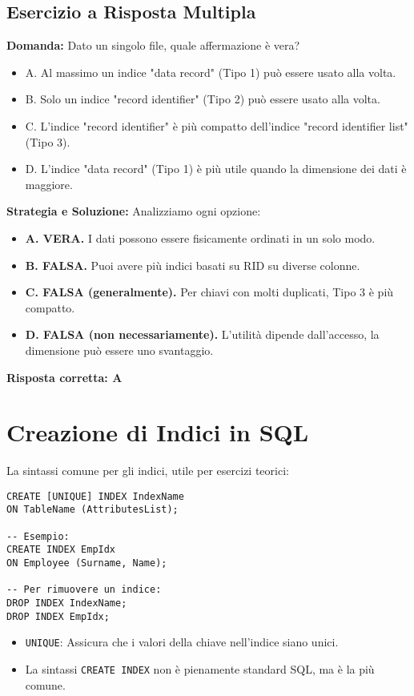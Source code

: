 \subsection{Esercizio a Risposta Multipla}
\textbf{Domanda:} Dato un singolo file, quale affermazione è vera?
\begin{itemize}
    \item A. Al massimo un indice "data record" (Tipo 1) può essere usato alla volta.
    \item B. Solo un indice "record identifier" (Tipo 2) può essere usato alla volta.
    \item C. L'indice "record identifier" è più compatto dell'indice "record identifier list" (Tipo 3).
    \item D. L'indice "data record" (Tipo 1) è più utile quando la dimensione dei dati è maggiore.
\end{itemize}

\textbf{Strategia e Soluzione:}
Analizziamo ogni opzione:
\begin{itemize}
    \item \textbf{A. VERA.} I dati possono essere fisicamente ordinati in un solo modo.
    \item \textbf{B. FALSA.} Puoi avere più indici basati su RID su diverse colonne.
    \item \textbf{C. FALSA (generalmente).} Per chiavi con molti duplicati, Tipo 3 è più compatto.
    \item \textbf{D. FALSA (non necessariamente).} L'utilità dipende dall'accesso, la dimensione può essere uno svantaggio.
\end{itemize}
\textbf{Risposta corretta: A}\section{Creazione di Indici in SQL}
La sintassi comune per gli indici, utile per esercizi teorici:
\begin{verbatim}
CREATE [UNIQUE] INDEX IndexName
ON TableName (AttributesList);

-- Esempio:
CREATE INDEX EmpIdx
ON Employee (Surname, Name);

-- Per rimuovere un indice:
DROP INDEX IndexName;
DROP INDEX EmpIdx;
\end{verbatim}
\begin{itemize}
    \item \texttt{UNIQUE}: Assicura che i valori della chiave nell'indice siano unici.
    \item La sintassi \texttt{CREATE INDEX} non è pienamente standard SQL, ma è la più comune.
\end{itemize}

